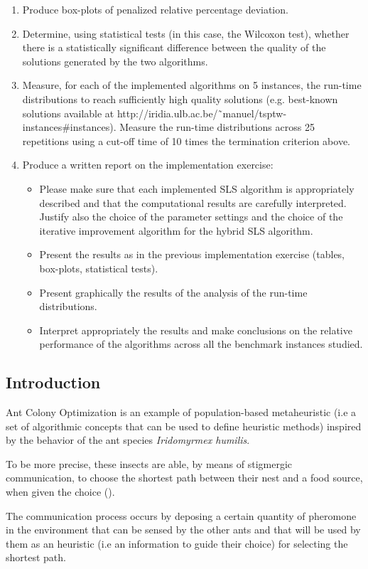 \begin{homeworkProblem}
\begin{enumerate}
\item Produce box-plots of penalized relative percentage deviation.
\item Determine, using statistical tests (in this case, the Wilcoxon test), whether there is a statistically significant difference between the quality of the solutions generated by the two algorithms.
\item Measure, for each of the implemented algorithms on 5 instances, the run-time distributions to reach sufficiently high quality solutions (e.g. best-known solutions available at http://iridia.ulb.ac.be/˜manuel/tsptw-instances\#instances).
Measure the run-time distributions across 25 repetitions using a cut-off time of 10 times the termination criterion above.
\item Produce a written report on the implementation exercise:
\begin{itemize}
  \item Please make sure that each implemented SLS algorithm is appropriately described and that the computational results are carefully interpreted. Justify also the choice of the parameter settings and the choice
of the iterative improvement algorithm for the hybrid SLS algorithm.
  \item Present the results as in the previous implementation exercise (tables, box-plots, statistical tests).
  \item Present graphically the results of the analysis of the run-time distributions.
  \item Interpret appropriately the results and make conclusions on the relative performance of the algorithms across all the benchmark instances studied.
\end{itemize}
\end{enumerate}

\subsection{Introduction} \label{sec:introACO}
Ant Colony Optimization is an example of population-based metaheuristic (i.e a set of algorithmic concepts that can be used to define heuristic methods) inspired by the behavior of the ant species \emph{Iridomyrmex humilis}.

To be more precise, these insects are able, by means of stigmergic communication, to choose the shortest path between their nest and a food source, when given the choice (\cite{deneubourg1990self}).

The communication process occurs by deposing a certain quantity of pheromone in the environment that can be sensed by the other ants and that will be used by them as an heuristic (i.e an information to guide their choice) for selecting the shortest path.


\end{homeworkProblem}
